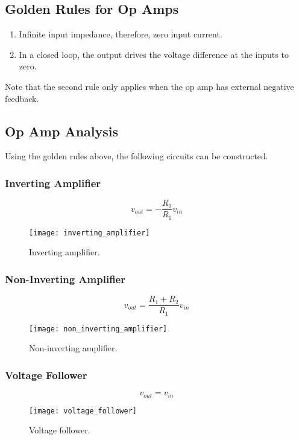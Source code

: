 \documentclass{article}
\begin{document}
\subsection{Golden Rules for Op Amps}
\begin{enumerate}
    \item Infinite input impedance, therefore, zero input current.
    \item In a closed loop, the output drives the voltage difference at the inputs to zero.
\end{enumerate}
Note that the second rule only applies when the op amp has external negative feedback.
\subsection{Op Amp Analysis}
Using the golden rules above, the following circuits can be constructed.
\subsubsection{Inverting Amplifier}
\begin{equation*}
    v_{out} = -\frac{R_2}{R_1}v_{in}
\end{equation*}
\begin{figure}[H]
    \centering
    \texttt{[image: inverting\_amplifier]}
    \caption{Inverting amplifier.}
\end{figure}
\subsubsection{Non-Inverting Amplifier}
\begin{equation*}
    v_{out} = \frac{R_1 + R_2}{R_1}v_{in}
\end{equation*}
\begin{figure}[H]
    \centering
    \texttt{[image: non\_inverting\_amplifier]}
    \caption{Non-inverting amplifier.}
\end{figure}
\subsubsection{Voltage Follower}
\begin{equation*}
    v_{out} = v_{in}
\end{equation*}
\begin{figure}[H]
    \centering
    \texttt{[image: voltage\_follower]}
    \caption{Voltage follower.}
\end{figure}
\end{document}
